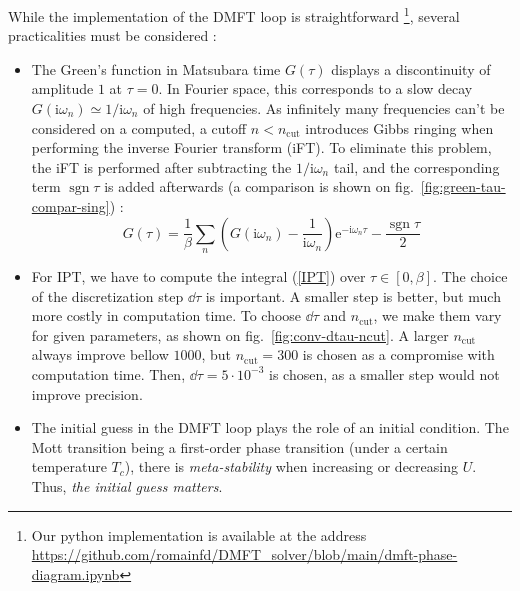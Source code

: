 \documentclass[reprint,amsmath,amssymb,aps,pra]{revtex4-2}
\newcommand{\iwn}{\mathrm{i}\omega_n}
\DeclareMathOperator{\sgn}{sgn}
\newcommand{\e}{\mathrm{e}}
\begin{document}
While the implementation of the DMFT loop is straightforward \footnote{Our python implementation is available at the address \url{https://github.com/romainfd/DMFT_solver/blob/main/dmft-phase-diagram.ipynb}}, several practicalities must be considered :
\begin{itemize}
    \item The Green's function in Matsubara time $G(\tau)$ displays a discontinuity of amplitude $1$ at $\tau=0$. In Fourier space, this corresponds to a slow decay $G(\iwn)\simeq 1/\iwn$ of high frequencies. As infinitely many frequencies can't be considered on a computed, a cutoff $n<n_\text{cut}$ introduces Gibbs ringing when performing the inverse Fourier transform (iFT). To eliminate this problem, the iFT is performed after subtracting the $1/\iwn$ tail, and the corresponding term $\sgn \tau$ is added afterwards (a comparison is shown on fig.\ \ref{fig:green-tau-compar-sing}) : \begin{equation} G (\tau) = \frac{1}{\beta}  \sum_{n} \left( G (\iwn) - \frac{1}{\iwn} \right) \e^{-\iwn\tau} - \frac{\sgn \tau}{2} \label{iFT-sing}\end{equation}
    
    \item For IPT, we have to compute the integral (\ref{IPT}) over $\tau \in [0,\beta]$. The choice of the discretization step $\dd{\tau}$ is important. A smaller step is better, but much more costly in computation time. To choose $\dd{\tau}$ and $n_\text{cut}$, we make them vary for given parameters, as shown on fig.\ \ref{fig:conv-dtau-ncut}. A larger $n_\text{cut}$ always improve bellow $1000$, but $n_\text{cut}=300$ is chosen as a compromise with computation time. Then, $\dd{\tau}=5\cdot 10^{-3}$ is chosen, as a smaller step would not improve precision.

    \item The initial guess in the DMFT loop plays the role of an initial condition. The Mott transition being a first-order phase transition (under a certain temperature $T_c$), there is \emph{meta-stability} when increasing or decreasing $U$. Thus, \emph{the initial guess matters}.
    

\end{itemize}
\end{document}
